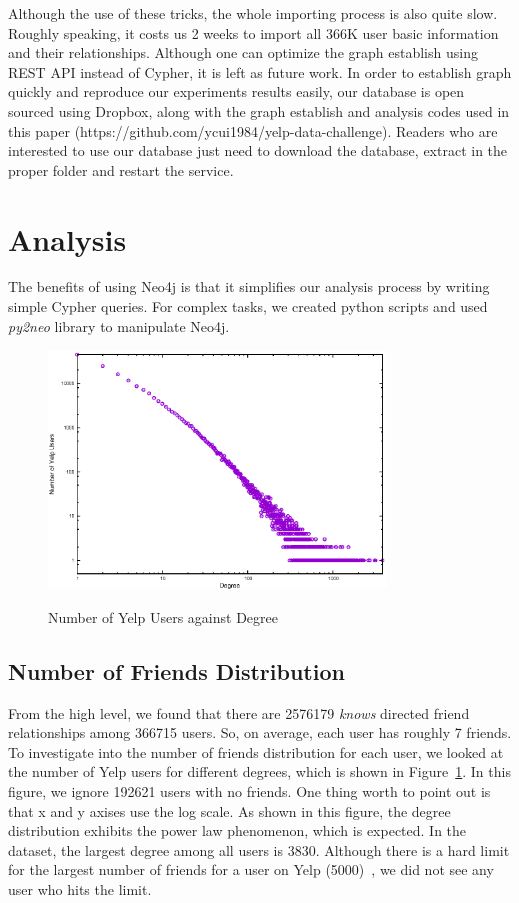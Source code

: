 \documentclass[11pt, oneside]{article}   	%
\begin{document}
Although the use of these tricks, the whole importing process is also quite slow. Roughly speaking, it costs us 2 weeks to 
import all 366K user basic information and their relationships. Although one can optimize the graph establish using REST API 
instead of Cypher, it is left as future work. In order to establish graph quickly and reproduce our experiments results easily, 
our database is open sourced using Dropbox, along with the graph establish and analysis codes used in this paper (https://github.com/ycui1984/yelp-data-challenge). Readers who are interested to use our database just need to download the database, extract
in the proper folder and restart the service. 

\section{Analysis}
The benefits of using Neo4j is that it simplifies our analysis process by writing simple Cypher queries. For complex 
tasks, we created python scripts and used \textit{py2neo} library to manipulate Neo4j. 

\begin{figure}[t]
  \centering
  \caption{Number of Yelp Users against Degree} 
       \includegraphics[width=0.8\textwidth]{figures/degree-distribution.eps}
  \label{fig:degree-dis}
\end{figure}

\subsection{Number of Friends Distribution} 
From the high level, we found that there are 2576179 \textit{knows} directed friend relationships among 366715 users. 
So, on average, each user has roughly 7 friends. To investigate into the number of friends distribution for each user, 
we looked at the number of Yelp users for different degrees, which is shown in Figure~\ref{fig:degree-dis}. In this figure, 
we ignore 192621 users with no friends. One thing worth to point out is that x and y axises use the log scale. 
As shown in this figure,  the degree distribution exhibits the power law phenomenon, which is expected. 
In the dataset, the largest degree among all users is 3830.  Although there is a hard limit for the largest number of 
friends for a user on Yelp (5000)~\cite{limit}, we did not see any user who hits the limit.   
\end{document}

